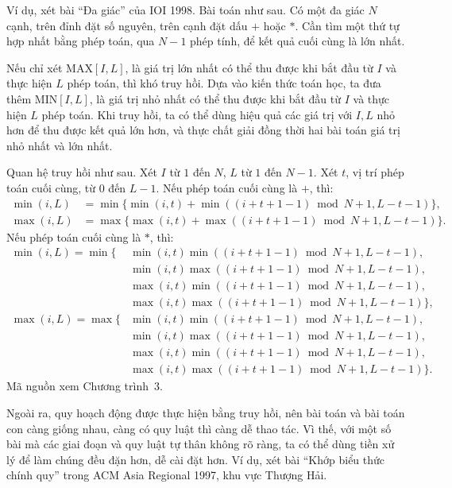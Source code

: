 \documentclass[11pt]{article}
\begin{document}
Ví dụ, xét bài ``Đa giác'' của IOI 1998. Bài toán như sau. Có một đa
giác \(N\) cạnh, trên đỉnh đặt số nguyên, trên cạnh đặt dấu \(+\) hoặc
\(*\). Cần tìm một thứ tự hợp nhất bằng phép toán, qua \(N-1\) phép tính, để
kết quả cuối cùng là lớn nhất.

Nếu chỉ xét \(\mathrm{MAX}[I,L]\), là giá trị lớn nhất có thể thu được khi
bắt đầu từ \(I\) và thực hiện \(L\) phép toán, thì khó truy hồi. Dựa vào kiến
thức toán học, ta đưa thêm \(\mathrm{MIN}[I,L]\), là giá trị nhỏ nhất có thể
thu được khi bắt đầu từ \(I\) và thực hiện \(L\) phép toán. Khi truy hồi, ta
có thể dùng hiệu quả các giá trị với \(I,L\) nhỏ hơn để thu được kết quả lớn
hơn, và thực chất giải đồng thời hai bài toán giá trị nhỏ nhất và lớn nhất.

Quan hệ truy hồi như sau. Xét \(I\) từ \(1\) đến \(N\), \(L\) từ \(1\) đến
\(N-1\). Xét \(t\), vị trí phép toán cuối cùng, từ \(0\) đến \(L-1\). Nếu phép
toán cuối cùng là \(+\), thì:
\[
\begin{aligned}
  \min(i,L) &=
  \min\{\min(i,t)+\min((i+t+1-1)\bmod N+1,L-t-1)\},\\
  \max(i,L) &=
  \max\{\max(i,t)+\max((i+t+1-1)\bmod N+1,L-t-1)\}.
\end{aligned}
\]
Nếu phép toán cuối cùng là \(*\), thì:
\[
\begin{aligned}
  \min(i,L)=\min\{&
  \min(i,t)\min((i+t+1-1)\bmod N+1,L-t-1),\\
  &\min(i,t)\max((i+t+1-1)\bmod N+1,L-t-1),\\
  &\max(i,t)\min((i+t+1-1)\bmod N+1,L-t-1),\\
  &\max(i,t)\max((i+t+1-1)\bmod N+1,L-t-1)\},\\
  \max(i,L)=\max\{&
  \min(i,t)\min((i+t+1-1)\bmod N+1,L-t-1),\\
  &\min(i,t)\max((i+t+1-1)\bmod N+1,L-t-1),\\
  &\max(i,t)\min((i+t+1-1)\bmod N+1,L-t-1),\\
  &\max(i,t)\max((i+t+1-1)\bmod N+1,L-t-1)\}.
\end{aligned}
\]
Mã nguồn xem Chương trình~3.

Ngoài ra, quy hoạch động được thực hiện bằng truy hồi, nên bài toán và bài
toán con càng giống nhau, càng có quy luật thì càng dễ thao tác. Vì thế, với
một số bài mà các giai đoạn và quy luật tự thân không rõ ràng, ta có thể dùng
tiền xử lý để làm chúng đều đặn hơn, dễ cài đặt hơn. Ví dụ, xét bài ``Khớp
biểu thức chính quy'' trong ACM Asia Regional 1997, khu vực Thượng Hải.
\end{document}

